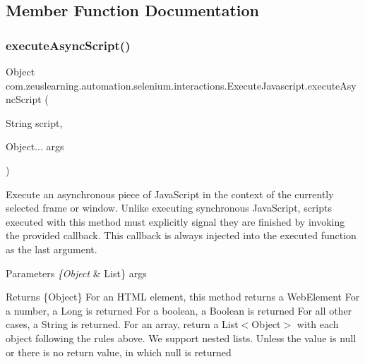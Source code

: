 \subsection{Member Function Documentation}
\hypertarget{classcom_1_1zeuslearning_1_1automation_1_1selenium_1_1interactions_1_1ExecuteJavascript_a5495b96ea1c285d54c93c10d09348c14}{}\label{classcom_1_1zeuslearning_1_1automation_1_1selenium_1_1interactions_1_1ExecuteJavascript_a5495b96ea1c285d54c93c10d09348c14} 
\subsubsection{\texorpdfstring{execute\+Async\+Script()}{executeAsyncScript()}}
{\footnotesize\ttfamily Object com.\+zeuslearning.\+automation.\+selenium.\+interactions.\+Execute\+Javascript.\+execute\+Async\+Script (\begin{DoxyParamCaption}\item[{String}]{script,  }\item[{Object...}]{args }\end{DoxyParamCaption})\hspace{0.3cm}{\ttfamily [inline]}}

Execute an asynchronous piece of Java\+Script in the context of the currently selected frame or window. Unlike executing synchronous Java\+Script, scripts executed with this method must explicitly signal they are finished by invoking the provided callback. This callback is always injected into the executed function as the last argument.


\begin{DoxyParams}{Parameters}
{\em \{\+Object} & List\} args \\
\hline
\end{DoxyParams}
\begin{DoxyReturn}{Returns}
\{Object\} For an H\+T\+ML element, this method returns a Web\+Element For a number, a Long is returned For a boolean, a Boolean is returned For all other cases, a String is returned. For an array, return a List$<$\+Object$>$ with each object following the rules above. We support nested lists. Unless the value is null or there is no return value, in which null is returned 
\end{DoxyReturn}


